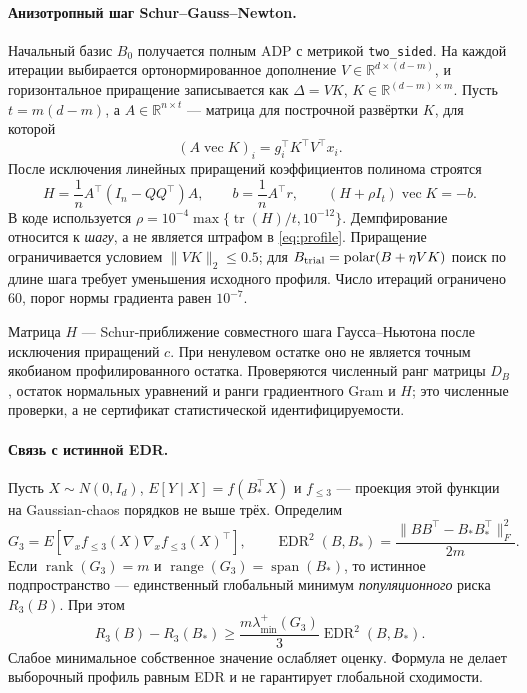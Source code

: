 \documentclass[10pt,a4paper]{article}
\newcommand{\R}{\mathbb R}
\newcommand{\norm}[1]{\lVert#1\rVert}
\newcommand{\code}[1]{\nolinkurl{#1}}
\begin{document}
\newpage
\paragraph{Анизотропный шаг Schur--Gauss--Newton.}
Начальный базис $B_0$ получается полным ADP с метрикой \code{two_sided}.
На каждой итерации выбирается ортонормированное дополнение
$V\in\R^{d\times(d-m)}$, и горизонтальное приращение записывается как
$\Delta=VK$, $K\in\R^{(d-m)\times m}$. Пусть $t=m(d-m)$,
а $A\in\R^{n\times t}$ --- матрица для построчной развёртки $K$, для которой
\[
 (A\operatorname{vec}K)_i=g_i^\top K^\top V^\top x_i.
\]
После исключения линейных приращений коэффициентов полинома строятся
\begin{equation}\label{eq:schur}
 H=\frac1nA^\top(I_n-QQ^\top)A,\qquad
 b=\frac1nA^\top r,\qquad
 (H+\rho I_t)\operatorname{vec}K=-b.
\end{equation}
В коде используется $\rho=10^{-4}\max\{\operatorname{tr}(H)/t,10^{-12}\}$.
Демпфирование относится к \emph{шагу}, а не является штрафом в
\eqref{eq:profile}. Приращение ограничивается условием
$\norm{VK}_2\le0.5$; для $B_{\rm trial}=\operatorname{polar}(B+\eta VK)$
поиск по длине шага требует уменьшения исходного профиля. Число итераций
ограничено 60, порог нормы градиента равен $10^{-7}$.

Матрица $H$ --- Schur-приближение совместного шага Гаусса--Ньютона после
исключения приращений $c$. При ненулевом остатке оно не является точным
якобианом профилированного остатка. Проверяются численный ранг матрицы $D_B$,
остаток нормальных уравнений и ранги градиентного Gram и $H$; это численные
проверки, а не сертификат статистической идентифицируемости.

\paragraph{Связь с истинной EDR.}
Пусть $X\sim N(0,I_d)$, $E[Y\mid X]=f(B_*^\top X)$ и $f_{\le3}$ ---
проекция этой функции на Gaussian-chaos порядков не выше трёх. Определим
\[
 G_3=E[\nabla_x f_{\le3}(X)\nabla_x f_{\le3}(X)^\top],\qquad
 \operatorname{EDR}^2(B,B_*)=
 \frac{\norm{BB^\top-B_*B_*^\top}_F^2}{2m}.
\]
Если $\operatorname{rank}(G_3)=m$ и $\operatorname{range}(G_3)=
\operatorname{span}(B_*)$, то истинное подпространство --- единственный
глобальный минимум \emph{популяционного} риска $R_3(B)$. При этом
\begin{equation}\label{eq:bound}
 R_3(B)-R_3(B_*)\ge
 \frac{m\lambda_{\min}^{+}(G_3)}{3}\operatorname{EDR}^2(B,B_*).
\end{equation}
Слабое минимальное собственное значение ослабляет оценку. Формула не делает
выборочный профиль равным EDR и не гарантирует глобальной сходимости.
\end{document}
